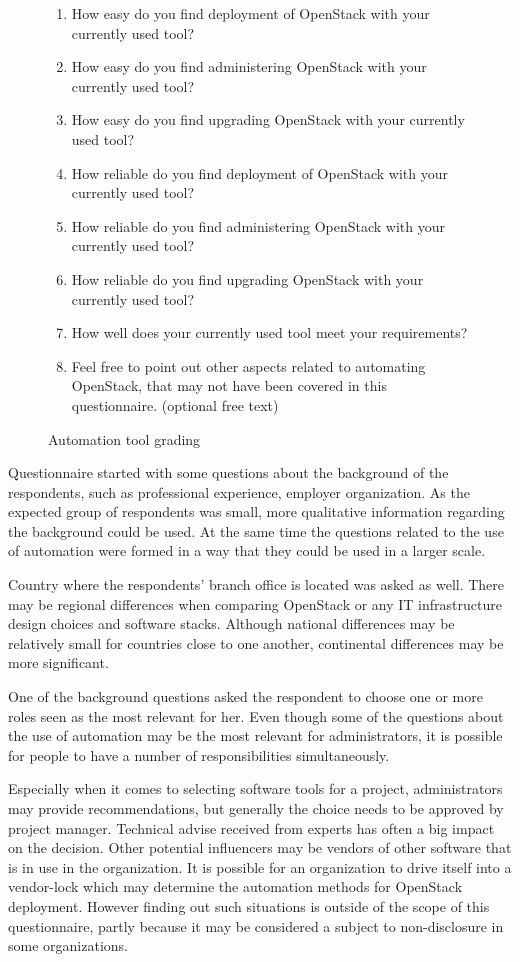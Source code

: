\documentclass[officiallayout]{tktla}
\begin{document}
\begin{figure}[t]
\begin{enumerate}
  \itemsep0em
  \item How easy do you find deployment of OpenStack with your currently used
        tool?
  \item How easy do you find administering OpenStack with your currently used
        tool?
  \item How easy do you find upgrading OpenStack with your currently used tool?
  \item How reliable do you find deployment of OpenStack with your currently
        used tool?
  \item How reliable do you find administering OpenStack with your currently
        used tool?
  \item How reliable do you find upgrading OpenStack with your currently used
        tool?
  \item How well does your currently used tool meet your requirements?
  \item Feel free to point out other aspects related to automating OpenStack,
        that may not have been covered in this questionnaire. (optional free
        text)
\end{enumerate}
\caption{Automation tool grading}
\label{fig:questionnaire-grading}
\end{figure}

Questionnaire started with some questions about the background of the
respondents, such as professional experience, employer organization. As the
expected group of respondents was small, more qualitative information regarding
the background could be used. At the same time the questions related to the use
of automation were formed in a way that they could be used in a larger scale.

Country where the respondents' branch office is located was asked as well.
There may be regional differences when comparing OpenStack or any IT
infrastructure design choices and software stacks. Although national
differences may be relatively small for countries close to one another,
continental differences may be more significant.

One of the background questions asked the respondent to choose one or more
roles seen as the most relevant for her. Even though some of the questions
about the use of automation may be the most relevant for administrators, it is
possible for people to have a number of responsibilities simultaneously.

Especially when it comes to selecting software tools for a project,
administrators may provide recommendations, but generally the choice needs to
be approved by project manager. Technical advise received from experts has
often a big impact on the decision. Other potential influencers may be vendors
of other software that is in use in the organization. It is possible for an
organization to drive itself into a vendor-lock which may determine the
automation methods for OpenStack deployment. However finding out such
situations is outside of the scope of this questionnaire, partly because it may
be considered a subject to non-disclosure in some organizations.
\end{document}
